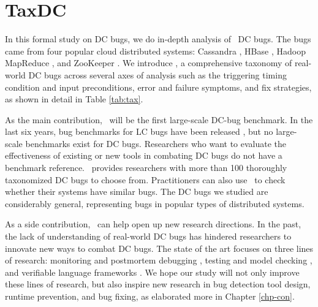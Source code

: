 
\section{TaxDC}
\label{sec-taxdc}

In this formal study on DC bugs, we do in-depth analysis of \numDcBugs\ DC
bugs.  The bugs came from four popular cloud distributed systems: Cassandra
\cite{CassandraWeb}, HBase \cite{HBaseWeb}, Hadoop MapReduce \cite{HadoopWeb},
and ZooKeeper \cite{ZooKeeperWeb}.
%
We introduce \taxdc, a comprehensive taxonomy of real-world DC bugs across
several axes of analysis such as the triggering timing condition and input
preconditions, error and failure symptoms, and fix strategies, as shown in
detail in Table \ref{tab:tax}.

As the main contribution, \tdc\ will be the first large-scale DC-bug benchmark.
In the last six years, bug benchmarks for LC bugs have been released
\cite{Jalbert11-RADBench, jieyu}, but no large-scale benchmarks exist for DC
bugs.  Researchers who want to evaluate the effectiveness of existing or new
tools in combating DC bugs do not have a benchmark reference.  \tdc\ provides
researchers with more than 100 thoroughly taxonomized DC bugs to choose from.
Practitioners can also use \tdc\ to check whether their systems have similar
bugs.  The DC bugs we studied are considerably general, representing bugs in
popular types of distributed systems.

As a side contribution, \tdc\ can help open up new research directions. In the
past, the lack of understanding of real-world DC bugs has hindered researchers
to innovate new ways to combat DC bugs.  The state of the art focuses on three
lines of research: monitoring and postmortem debugging \cite{Geels+07-Friday,
Liu+08-D3S, Liu+07-WiDS, Reynolds+06-Pip}, testing and model checking
\cite{Guo+11-Demeter, Killian+07-LifeDeathMaceMC,
Simsa+10-Dbug, Yang+09-Modist}, and verifiable language frameworks
\cite{Desai+13-PLang, Wilcox+15-Verdi}.  We hope our study will not only improve
these lines of research, but also inspire new research in bug detection tool
design, runtime prevention, and bug fixing, as elaborated more in Chapter
\ref{chp-con}.

